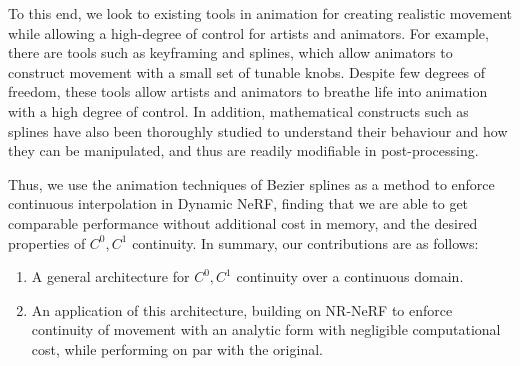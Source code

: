 To this end, we look to existing tools in animation for creating realistic movement while allowing a high-degree of control for artists and animators. For example, there are tools such as keyframing and splines, which allow animators to construct movement with a small set of tunable knobs. Despite few degrees of freedom, these tools allow artists and animators to breathe life into animation with a high degree of control. In addition, mathematical constructs such as splines have also been thoroughly studied to understand their behaviour and how they can be manipulated, and thus are readily modifiable in post-processing.

Thus, we use the animation techniques of Bezier splines as a method to enforce continuous interpolation in Dynamic NeRF, finding that we are able to get comparable performance without additional cost in memory, and the desired properties of $C^0, C^1$ continuity.
In summary, our contributions are as follows:

\begin{enumerate}
    \item A general architecture for $C^0, C^1$ continuity over a continuous domain.
    \item An application of this architecture, building on NR-NeRF to enforce continuity of movement with an analytic form with negligible computational cost, while performing on par with the original.
\end{enumerate}

